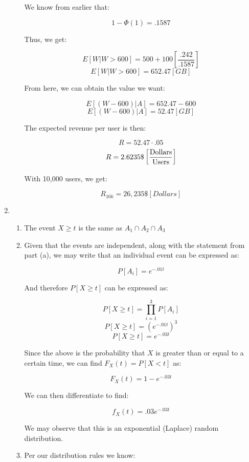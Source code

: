 \begin{enumerate}
\begin{enumerate}
        We know from earlier that:

        $$1-\Phi(1)=.1587$$

        Thus, we get:

        $$E[W|W>600]=500+100\left[ \frac{.242}{.1587} \right]$$
        $$E[W|W>600]=652.47[\si{GB}]$$

        From here, we can obtain the value we want:

        $$E[(W-600)|A]=652.47-600$$
        $$\boxed{E[(W-600)|A]=52.47[\si{GB}]}$$

        The expected revenue per user is then:

        $$R=52.47\cdot.05$$
        $$R=2.6235\$\left[ \si{Dollars\over Users} \right]$$

        With 10,000 users, we get:

        $$\boxed{R_{10k}=26,235\$\left[ \si{Dollars} \right]}$$

    \end{enumerate}

  \item

    \begin{enumerate}

      \item The event $X\geq t$ is the same as $A_1\cap A_2\cap A_3$

      \item Given that the events are independent, along with the statement from part (a), we may write that an individual event can be expressed as:

        $$P[A_i]=e^{-.01t}$$

        And therefore $P[X\geq t]$ can be expressed as:

        $$P[X\geq t]=\prod_{i=1}^3 P[A_i]$$
        $$P[X\geq t]=\left( e^{-.01t} \right)^3$$
        $$\boxed{P[X\geq t]=e^{-.03t}}$$

        Since the above is the probability that $X$ is greater than or equal to a certain time, we can find $F_X(t)=P[X< t]$ as:

        $$\boxed{F_X(t)=1-e^{-.03t}}$$

        We can then differentiate to find:

        $$\boxed{f_X(t)=.03e^{-.03t}}$$

        We may observe that this is an exponential (Laplace) random distribution.

      \item Per our distribution rules we know:


\end{enumerate}
\end{enumerate}
